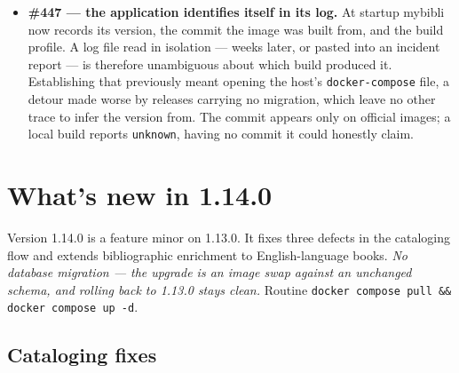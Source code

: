 \begin{itemize}
  \item \textbf{\#447 \string— the application identifies itself in
        its log.} At startup mybibli now records its version, the
        commit the image was built from, and the build profile. A log
        file read in isolation — weeks later, or pasted into an
        incident report — is therefore unambiguous about which build
        produced it. Establishing that previously meant opening the
        host's \texttt{docker-compose} file, a detour made worse by
        releases carrying no migration, which leave no other trace to
        infer the version from. The commit appears only on official
        images; a local build reports \texttt{unknown}, having no
        commit it could honestly claim.
\end{itemize}

\section{What's new in 1.14.0}\label{sec:whats-new-1.14.0}

Version 1.14.0 is a feature minor on 1.13.0. It fixes three defects in
the cataloging flow and extends bibliographic enrichment to
English-language books. \emph{No database migration — the upgrade is
an image swap against an unchanged schema, and rolling back to 1.13.0
stays clean.} Routine \texttt{docker compose pull \&\& docker compose
up -d}.

\subsection*{Cataloging fixes}

